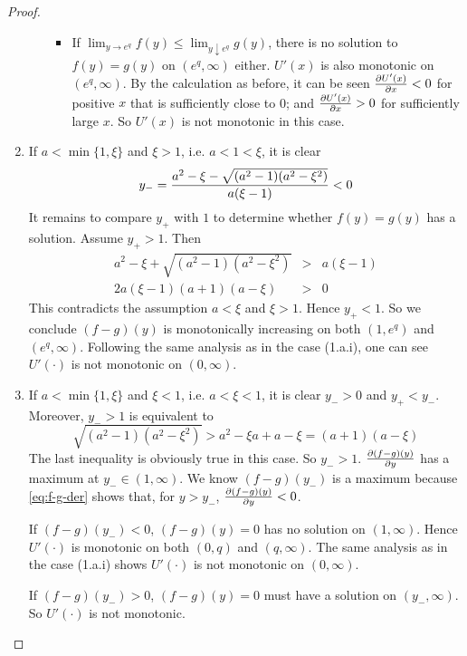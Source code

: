 \documentclass[11pt,a4]{amsart}
\newcommand{\pd}{\partial}
\newcommand{\1}{{\mathbf 1}}
\begin{document}
\begin{proof}
\begin{enumerate}
\begin{enumerate}
\begin{itemize}
      \item
        If $ \lim_{y \to e^q} f(y) \le \lim_{y \downarrow e^q} g(y)$,
        there is no solution to $f(y) = g(y)$ on $(e^q,
        \infty)$ either. $U'(x)$ is also monotonic on
        $(e^q, \infty)$. By the calculation as before, it can be seen
        ${\pd U'(x) \over \pd x} < 0$ for positive $x$ that is
        sufficiently close to 0; and
        ${\pd U'(x) \over \pd x} > 0$ for sufficiently large $x$.
        So $U'(x)$ is not monotonic in this case.
      \end{itemize}
    \end{enumerate}
  \item If $a < \min\{1, \xi\}$ and $\xi > 1$, i.e. $a < 1 < \xi$, it
    is clear
    \[
    y_- = {
      a^2 - \xi - \sqrt{(a^2 - 1) (a^2 - \xi^2)}
      \over
      a (\xi - 1)
    } < 0
    \]
    It remains to compare $y_+$ with $1$ to determine whether $f(y) =
    g(y)$ has a solution. Assume $y_+ > 1$. Then
    \begin{eqnarray*}
      a^2 - \xi + \sqrt{(a^2 - 1) (a^2 - \xi^2)} &>& a (\xi - 1) \\
      2 a (\xi - 1) (a + 1) (a - \xi) &>& 0
    \end{eqnarray*}
    This contradicts the assumption $a < \xi$ and $\xi > 1$. Hence
    $y_+ < 1$. So we conclude $(f - g)(y)$ is monotonically increasing
    on both $(1, e^q)$ and $(e^q, \infty)$. Following the same
    analysis as in the case (1.a.i), one can see $U'(\cdot)$ is not
    monotonic on $(0, \infty)$.

  \item If $a < \min\{1, \xi\}$ and $\xi < 1$, i.e. $a < \xi < 1$, it
    is clear $y_- > 0$ and $y_+ < y_-$. Moreover, $y_- > 1$ is equivalent
    to
    \[
    \sqrt{(a^2 - 1) (a^2 - \xi^2)} > a^2 - \xi a + a - \xi = (a + 1) (a - \xi)
    \]
    The last inequality is obviously true in this case. So $y_- >
    1$. ${\pd (f-g)(y) \over \pd y}$ has a maximum at
    $y_- \in (1, \infty)$. We know $(f - g)(y_-)$ is a maximum because
    \eqref{eq:f-g-der} shows that, for $y > y_-$,
    ${\pd (f-g)(y) \over \pd y} < 0$.

    If $(f-g)(y_-) < 0$, $(f-g)(y) = 0$ has no solution on $(1,
    \infty)$. Hence $U'(\cdot)$ is monotonic on both $(0, q)$ and $(q,
    \infty)$. The same analysis as in the case (1.a.i) shows $U'(\cdot)$
    is not monotonic on $(0, \infty)$.

    If $(f-g)(y_-) > 0$, $(f-g)(y) = 0$ must have a solution on $(y_-,
    \infty)$. So $U'(\cdot)$ is not monotonic.
  \end{enumerate}
\end{proof}



\end{document}
